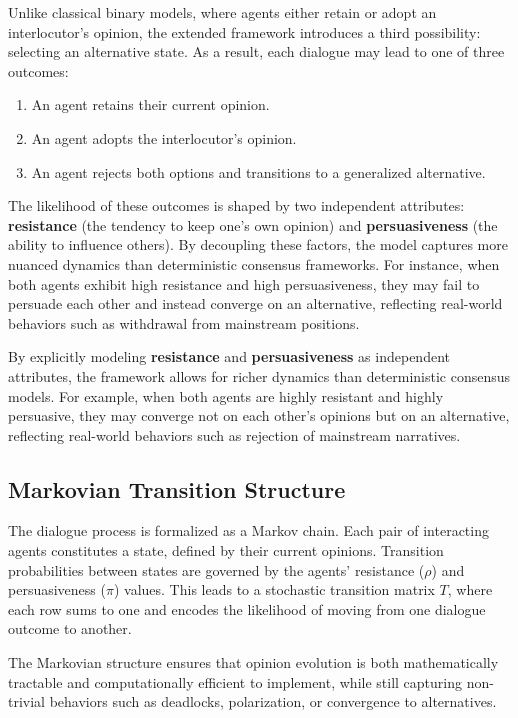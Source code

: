 \documentclass[
]{ceurart}
\begin{document}
Unlike classical binary models, where agents either retain or adopt an interlocutor’s opinion, the extended framework introduces a third possibility: selecting an alternative state. As a result, each dialogue may lead to one of three outcomes:
\begin{enumerate}
	\item An agent retains their current opinion.
	\item An agent adopts the interlocutor’s opinion.
	\item An agent rejects both options and transitions to a generalized alternative.
\end{enumerate}
The likelihood of these outcomes is shaped by two independent attributes: \textbf{resistance} (the tendency to keep one’s own opinion) and \textbf{persuasiveness} (the ability to influence others). By decoupling these factors, the model captures more nuanced dynamics than deterministic consensus frameworks. For instance, when both agents exhibit high resistance and high persuasiveness, they may fail to persuade each other and instead converge on an alternative, reflecting real-world behaviors such as withdrawal from mainstream positions.

By explicitly modeling \textbf{resistance} and \textbf{persuasiveness} as independent attributes, the framework allows for richer dynamics than deterministic consensus models. For example, when both agents are highly resistant and highly persuasive, they may converge not on each other’s opinions but on an alternative, reflecting real-world behaviors such as rejection of mainstream narratives.


\subsection{Markovian Transition Structure}
The dialogue process is formalized as a Markov chain. Each pair of interacting agents constitutes a state, defined by their current opinions. Transition probabilities between states are governed by the agents’ resistance ($\rho$) and persuasiveness ($\pi$) values. This leads to a stochastic transition matrix $T$, where each row sums to one and encodes the likelihood of moving from one dialogue outcome to another.

The Markovian structure ensures that opinion evolution is both mathematically tractable and computationally efficient to implement, while still capturing non-trivial behaviors such as deadlocks, polarization, or convergence to alternatives.
\end{document}
